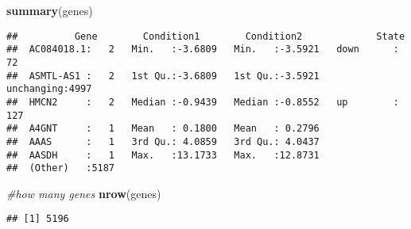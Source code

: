 \documentclass[]{article}
\newenvironment{Shaded}{\begin{snugshade}}{\end{snugshade}}
\newcommand{\KeywordTok}[1]{\textcolor[rgb]{0.13,0.29,0.53}{\textbf{#1}}}
\newcommand{\CommentTok}[1]{\textcolor[rgb]{0.56,0.35,0.01}{\textit{#1}}}
\newcommand{\OperatorTok}[1]{\textcolor[rgb]{0.81,0.36,0.00}{\textbf{#1}}}
\newcommand{\NormalTok}[1]{#1}
\begin{document}
\begin{Shaded}
\begin{Highlighting}[]
\KeywordTok{summary}\NormalTok{(genes)}
\end{Highlighting}
\end{Shaded}

\begin{verbatim}
##          Gene        Condition1        Condition2             State     
##  AC084018.1:   2   Min.   :-3.6809   Min.   :-3.5921   down      :  72  
##  ASMTL-AS1 :   2   1st Qu.:-3.6809   1st Qu.:-3.5921   unchanging:4997  
##  HMCN2     :   2   Median :-0.9439   Median :-0.8552   up        : 127  
##  A4GNT     :   1   Mean   : 0.1800   Mean   : 0.2796                    
##  AAAS      :   1   3rd Qu.: 4.0859   3rd Qu.: 4.0437                    
##  AASDH     :   1   Max.   :13.1733   Max.   :12.8731                    
##  (Other)   :5187
\end{verbatim}

\begin{Shaded}
\begin{Highlighting}[]
\CommentTok{#how many genes}
\KeywordTok{nrow}\NormalTok{(genes)}
\end{Highlighting}
\end{Shaded}

\begin{verbatim}
## [1] 5196
\end{verbatim}

\begin{Shaded}
\end{Shaded}
\end{document}
